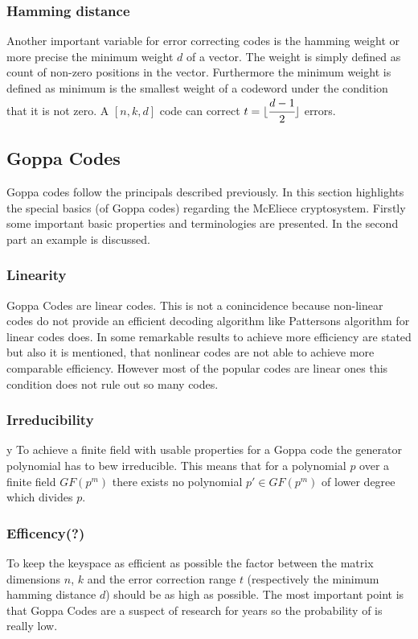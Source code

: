 \subsubsection*{Hamming distance} Another important variable for error correcting codes is the hamming weight or more precise the minimum weight $d$ of a vector. The weight is simply defined as count of non-zero positions in the vector. Furthermore the minimum weight is defined as minimum is the smallest weight of a codeword under the condition that it is not zero. 
A $[n, k, d]$ code can correct $t =  \lfloor \cfrac{d - 1}{2}\rfloor$ errors. 

\subsection*{Goppa Codes}
\label{goppa}
Goppa codes follow the principals described previously. In this section highlights the special basics (of Goppa codes) regarding the McEliece cryptosystem. Firstly some important basic properties and terminologies are presented. In the second part an example is discussed. 

\subsubsection*{Linearity}
Goppa Codes are linear codes. This is not a conincidence because non-linear codes do not provide an efficient decoding algorithm like Pattersons algorithm for linear codes does\cite{patterson1975algebraic}. In \cite{zeng2014nonlinear} some remarkable results to achieve more efficiency are stated but also it is mentioned, that nonlinear codes are not able to achieve more comparable efficiency. 
However most of the popular codes are linear ones this condition does not rule out so many codes.

\subsubsection*{Irreducibility} 
y
To achieve a finite field with usable properties for a Goppa code the generator polynomial has to bew irreducible. This means that for a polynomial $p$ over a finite field $GF(p^m)$ there exists no polynomial $p' \in GF(p^m)$ of lower degree which divides $p$.
 

\subsubsection*{Efficency(?)} To keep the keyspace as efficient as possible the factor between the matrix dimensions $n$, $k$ and the error correction range $t$ (respectively the minimum hamming distance $d$) should be as high as possible. The most important point is that Goppa Codes are a suspect of research for years so the probability of is really low. 




